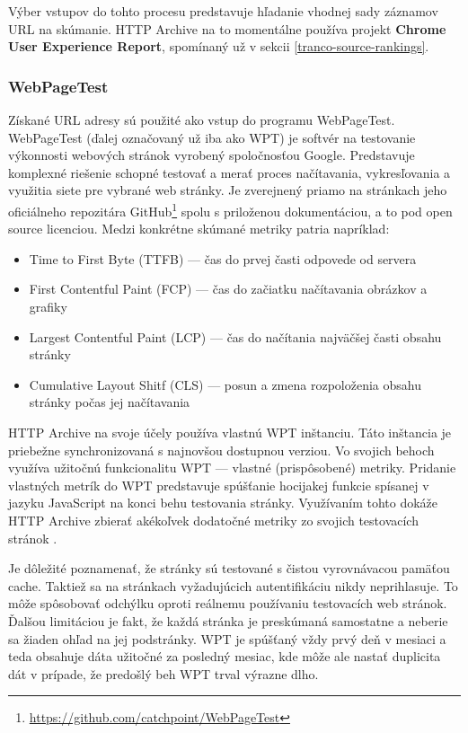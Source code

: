 Výber vstupov do tohto procesu predstavuje hľadanie vhodnej sady záznamov URL na skúmanie. 
HTTP Archive na to momentálne používa projekt \textbf{Chrome User Experience Report}, spomínaný už v sekcii \ref{tranco-source-rankings}.

\subsubsection{WebPageTest}

Získané URL adresy sú použité ako vstup do programu WebPageTest. WebPageTest (ďalej označovaný už iba ako WPT) je softvér na testovanie výkonnosti webových stránok vyrobený spoločnosťou Google. 
Predstavuje komplexné riešenie schopné testovať a merať proces načítavania, vykresľovania a využitia siete pre vybrané web stránky. 
Je zverejnený priamo na stránkach jeho oficiálneho repozitára GitHub\footnote{\href{https://github.com/catchpoint/WebPageTest}{https://github.com/catchpoint/WebPageTest}} spolu s priloženou dokumentáciou, a to pod open source licenciou.
Medzi konkrétne skúmané metriky patria napríklad: \cite{webpagetest}
\begin{itemize}
    \item Time to First Byte (TTFB) --- čas do prvej časti odpovede od servera
    \item First Contentful Paint (FCP) --- čas do začiatku načítavania obrázkov a grafiky
    \item Largest Contentful Paint (LCP) --- čas do načítania najväčšej časti obsahu stránky 
    \item Cumulative Layout Shitf (CLS) --- posun a zmena rozpoloženia obsahu stránky počas jej načítavania
\end{itemize}

HTTP Archive na svoje účely používa vlastnú WPT inštanciu. 
Táto inštancia je priebežne synchronizovaná s najnovšou dostupnou verziou.
Vo svojich behoch využíva užitočnú funkcionalitu WPT --- vlastné (prispôsobené) metriky.
Pridanie vlastných metrík do WPT predstavuje spúšťanie hocijakej funkcie spísanej v jazyku JavaScript na konci behu testovania stránky. 
Využívaním tohto dokáže HTTP Archive zbierať akékoľvek dodatočné metriky zo svojich testovacích stránok \cite{webpagetest}.

\pagebreak

Je dôležité poznamenať, že stránky sú testované s čistou vyrovnávacou pamäťou cache. 
Taktiež sa na stránkach vyžadujúcich autentifikáciu nikdy neprihlasuje.
To môže spôsobovať odchýlku oproti reálnemu používaniu testovacích web stránok. 
Ďalšou limitáciou je fakt, že každá stránka je preskúmaná samostatne a neberie sa žiaden ohľad na jej podstránky.
WPT je spúšťaný vždy prvý deň v mesiaci a teda obsahuje dáta užitočné za posledný mesiac, kde môže ale nastať duplicita dát v prípade, že predošlý beh WPT trval výrazne dlho.

